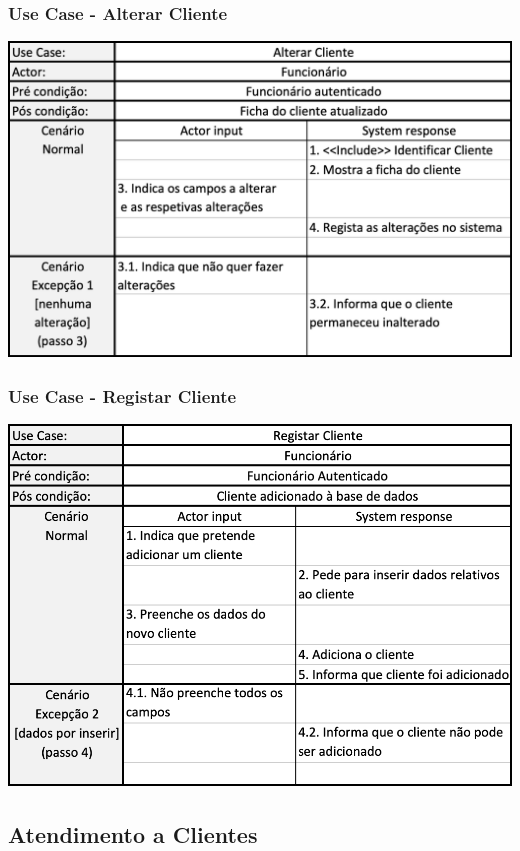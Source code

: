 \subsubsection{Use Case - Alterar Cliente}
\begin{center}
 	\includegraphics[width = 5.5in]{D_E_USECASE/uc_alterar_cliente.png}
\end{center}
\subsubsection{Use Case - Registar Cliente}
\begin{center}
 	\includegraphics[width = 5.5in]{D_E_USECASE/uc_registar_cliente.png}
\end{center}

\newpage
\subsection{Atendimento a Clientes}
